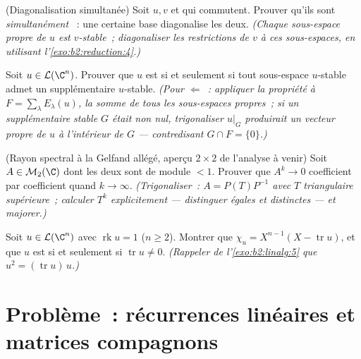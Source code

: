 \begin{exercise}[$\star\star\star$]\label{exo:b2:reduction:9}
(Diagonalisation simultanée) Soit $u, v$  et qui
commutent. Prouver qu'ils sont \emph{simultanément} ~:
une certaine base diagonalise les deux. \emph{(Chaque sous-espace
propre de $u$ est $v$-stable~; diagonaliser les restrictions de $v$ à
ces sous-espaces, en utilisant l'\cref{exo:b2:reduction:4}.)}
\end{exercise}

\begin{exercise}[$\star\star\star$]\label{exo:b2:reduction:10}
Soit $u \in \mathcal{L}(\C^n)$. Prouver que $u$ est  si
et seulement si tout sous-espace $u$-stable admet un supplémentaire
$u$-stable. \emph{(Pour $\Leftarrow$~: appliquer la propriété à $F =
\sum_\lambda E_\lambda(u)$, la somme de tous les sous-espaces
propres~; si un supplémentaire stable $G$ était non nul, trigonaliser
$u|_G$ produirait un vecteur propre de $u$ à l'intérieur de $G$ ---
contredisant $G \cap F = \{0\}$.)}
\end{exercise}

\begin{exercise}[$\star\star\star$]\label{exo:b2:reduction:11}
(Rayon spectral à la Gelfand allégé, aperçu $2\times2$ de l'analyse à
venir) Soit $A \in \mathcal{M}_2(\C)$ dont les deux 
sont de module $< 1$. Prouver que $A^k \to 0$ coefficient par
coefficient quand $k \to \infty$. \emph{(Trigonaliser~: $A =
P(T)P^{-1}$ avec $T$ triangulaire supérieure~; calculer $T^k$
explicitement --- distinguer  égales et distinctes ---
et majorer.)}
\end{exercise}

\begin{exercise}[$\star\star$]\label{exo:b2:reduction:12}
Soit $u \in \mathcal{L}(\C^n)$ avec $\operatorname{rk} u = 1$ ($n \geq
2$). Montrer que $\chi_u = X^{n-1}(X - \operatorname{tr} u)$, et que
$u$ est  si et seulement si $\operatorname{tr} u \neq
0$. \emph{(Rappeler de l'\cref{exo:b2:linalg:5} que $u^2 =
(\operatorname{tr} u)\,u$.)}
\end{exercise}

\section{Problème~: récurrences linéaires et matrices compagnons}

